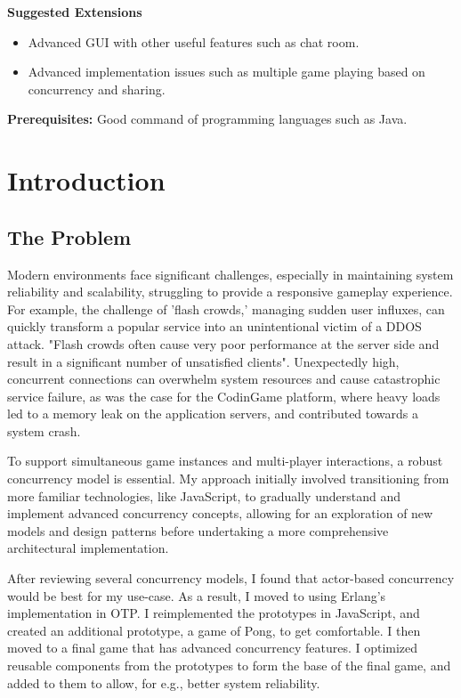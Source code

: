 \documentclass[]{final}
\begin{document}
\textbf{Suggested Extensions}
\begin{itemize}
  \item Advanced GUI with other useful features such as chat room.
  \item Advanced implementation issues such as multiple game playing based on concurrency and sharing.
\end{itemize}

\textbf{Prerequisites:} Good command of programming languages such as Java.


\chapter{Introduction}
\section{The Problem}

\label{rationale_problem}

Modern environments face significant challenges, especially in maintaining
system reliability and scalability, struggling to provide a responsive gameplay
experience. For example, the challenge of 'flash crowds,' managing sudden user influxes,
can quickly transform a popular service into an unintentional victim of a
DDOS attack. "Flash crowds often cause very poor performance
at the server side and result in a significant number of unsatisfied
clients"\cite{Ari_crss_nodate}. Unexpectedly high, concurrent connections can overwhelm
system resources and cause catastrophic service failure, as was the case for
the CodinGame platform, where heavy loads led to a memory leak on the application
servers, and contributed towards a system crash\cite{jobert_story_2017}.

To support simultaneous game instances and multi-player interactions,
a robust concurrency model is essential. My approach initially involved
transitioning from more familiar technologies, like JavaScript, to
gradually understand and implement advanced concurrency concepts,
allowing for an exploration of new models and design patterns before
undertaking a more comprehensive architectural implementation.

After reviewing several concurrency models,
I found that actor-based concurrency would be best for my use-case.
As a result, I moved to using Erlang's implementation in OTP.
I reimplemented the prototypes in JavaScript, and created an additional
prototype, a game of Pong, to get comfortable.
I then moved to a final game that has advanced concurrency
features. I optimized reusable components from the prototypes to form the
base of the final game, and added to them to allow, for e.g., better system
reliability.
\end{document}
